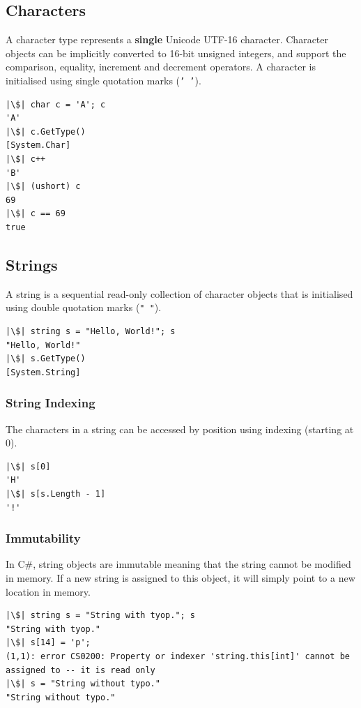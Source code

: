 \documentclass{article}
\begin{document}
\subsection{Characters}
A character type represents a \textbf{single} Unicode UTF-16 character.
Character objects can be implicitly converted to 16-bit unsigned
integers, and support the comparison, equality, increment and
\linebreak decrement operators. A character is initialised using single
quotation marks (\texttt{' '}).
\begin{verbatim}
|\$| char c = 'A'; c
'A'
|\$| c.GetType()
[System.Char]
|\$| c++
'B'
|\$| (ushort) c
69
|\$| c == 69
true
\end{verbatim}
\subsection{Strings}
A string is a sequential read-only collection of character objects that
is initialised using double quotation marks (\texttt{" "}).
\begin{verbatim}
|\$| string s = "Hello, World!"; s
"Hello, World!"
|\$| s.GetType()
[System.String]
\end{verbatim}
\subsubsection{String Indexing}
The characters in a string can be accessed by position using indexing
(starting at 0).
\begin{verbatim}
|\$| s[0]
'H'
|\$| s[s.Length - 1]
'!'
\end{verbatim}
\subsubsection{Immutability}
In C\#, string objects are immutable meaning that the string cannot be
modified in memory. If a new string is assigned to this object, it will
simply point to a new location in memory.
\begin{verbatim}
|\$| string s = "String with tyop."; s
"String with tyop."
|\$| s[14] = 'p';
(1,1): error CS0200: Property or indexer 'string.this[int]' cannot be assigned to -- it is read only
|\$| s = "String without typo."
"String without typo."
\end{verbatim}
\end{document}
